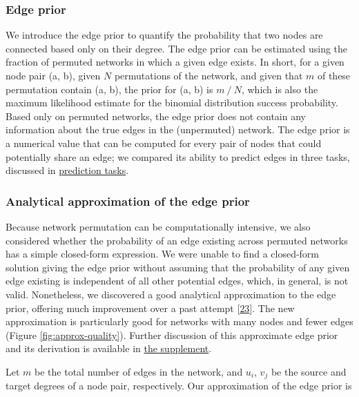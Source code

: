 \hypertarget{edge-prior}{%
\subsubsection{Edge prior}\label{edge-prior}}

We introduce the edge prior to quantify the probability that two nodes are connected based only on their degree.
The edge prior can be estimated using the fraction of permuted networks in which a given edge exists.
In short, for a given node pair (a, b), given \(N\) permutations of the network, and given that \(m\) of these permutation contain (a, b), the prior for (a, b) is \(m \mathbin{/} N\), which is also the maximum likelihood estimate for the binomial distribution success probability.
Based only on permuted networks, the edge prior does not contain any information about the true edges in the (unpermuted) network.
The edge prior is a numerical value that can be computed for every pair of nodes that could potentially share an edge; we compared its ability to predict edges in three tasks, discussed in \protect\hyperlink{tasks}{prediction tasks}.

\hypertarget{analytical-approximation-of-the-edge-prior}{%
\subsubsection{Analytical approximation of the edge prior}\label{analytical-approximation-of-the-edge-prior}}

Because network permutation can be computationally intensive, we also considered whether the probability of an edge existing across permuted networks has a simple closed-form expression.
We were unable to find a closed-form solution giving the edge prior without assuming that the probability of any given edge existing is independent of all other potential edges, which, in general, is not valid.
Nonetheless, we discovered a good analytical approximation to the edge prior, offering much improvement over a past attempt {[}\protect\hyperlink{ref-19OyKPQ4M}{23}{]}.
The new approximation is particularly good for networks with many nodes and fewer edges (Figure \ref{fig:approx-quality}).
Further discussion of this approximate edge prior and its derivation is available in \protect\hyperlink{approx-prior-supp}{the supplement}.

Let \(m\) be the total number of edges in the network, and \(u_i\), \(v_j\) be the source and target degrees of a node pair, respectively.
Our approximation of the edge prior is

